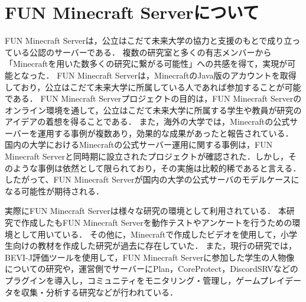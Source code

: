\section{FUN Minecraft Serverについて}
FUN Minecraft Server\cite{bib:fun_minecraft_server}は，公立はこだて未来大学の協力と支援のもとで成り立っている公認のサーバーである．
複数の研究室と多くの有志メンバーから「Minecraftを用いた数多くの研究に繋がる可能性」への共感を得て，実現が可能となった．
FUN Minecraft Serverは，MinecraftのJava版のアカウントを取得しており，公立はこだて未来大学に所属している人であれば参加することが可能である．
FUN Minecraft Serverプロジェクトの目的は，FUN Minecraft Serverのオンライン環境を通して，公立はこだて未来大学に所属する学生や教員が研究のアイデアの着想を得ることである．
また，海外の大学では，Minecraftの公式サーバーを運用する事例が複数あり，効果的な成果があったと報告されている\cite{bib:cambridge_minecraft_server}．
国内の大学におけるMinecraftの公式サーバー運用に関する事例は，FUN Minecraft Serverと同時期に設立されたプロジェクトが確認された．しかし，そのような事例は依然として限られており，その実施は比較的稀であると言える．
したがって、FUN Minecraft Serverが国内の大学の公式サーバのモデルケースになる可能性が期待される．

実際にFUN Minecraft Serverは様々な研究の環境として利用されている\cite{bib:fun_minecraft_server_research,bib:fun_minecraft_server_research2}．
本研究で作成した{\mason}もFUN Minecraft Serverを動作テストやアンケートを行うための環境として用いている．
その他に，Minecraftで作成したビデオを使用して，小学生向けの教材を作成した研究が過去に存在していた．
また，現行の研究では，BEVI-J評価ツールを使用して，FUN Minecraft Serverに参加した学生の人物像についての研究や，運営側でサーバーにPlan，CoreProtect，DiscordSRVなどのプラグインを導入し，コミュニティをモニタリング・管理し，ゲームプレイデータを収集・分析する研究などが行われている．